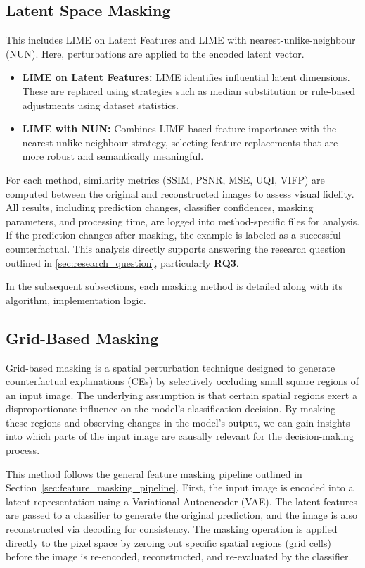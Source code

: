 \subsection*{Latent Space Masking}
This includes LIME on Latent Features and LIME with nearest-unlike-neighbour (NUN). Here, perturbations are applied to the encoded latent vector.
\begin{itemize}
    \item \textbf{LIME on Latent Features:} LIME identifies influential latent dimensions. These are replaced using strategies such as median substitution or rule-based adjustments using dataset statistics.
    \item \textbf{LIME with NUN:} Combines LIME-based feature importance with the nearest-unlike-neighbour strategy, selecting feature replacements that are more robust and semantically meaningful.
\end{itemize}

For each method, similarity metrics (SSIM, PSNR, MSE, UQI, VIFP) are computed between the original and reconstructed images to assess visual fidelity. All results, including prediction changes, classifier confidences, masking parameters, and processing time, are logged into method-specific files for analysis. If the prediction changes after masking, the example is labeled as a successful counterfactual. This analysis directly supports answering the research question outlined in \cref{sec:research_question}, particularly \textbf{RQ3}.


In the subsequent subsections, each masking method is detailed along with its algorithm, implementation logic.
 

\subsection{Grid-Based Masking} \label{sec:grid_based_masking}

Grid-based masking is a spatial perturbation technique designed to generate counterfactual explanations (CEs) by selectively occluding small square regions of an input image. The underlying assumption is that certain spatial regions exert a disproportionate influence on the model’s classification decision. By masking these regions and observing changes in the model’s output, we can gain insights into which parts of the input image are causally relevant for the decision-making process.

This method follows the general feature masking pipeline outlined in Section~\ref{sec:feature_masking_pipeline}. First, the input image is encoded into a latent representation using a Variational Autoencoder (VAE). The latent features are passed to a classifier to generate the original prediction, and the image is also reconstructed via decoding for consistency. The masking operation is applied directly to the pixel space by zeroing out specific spatial regions (grid cells) before the image is re-encoded, reconstructed, and re-evaluated by the classifier.

